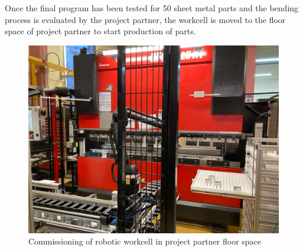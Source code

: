 Once the final program has been tested for 50 sheet metal parts and the bending process is evaluated by the project partner, the workcell is moved to the floor space of project partner to start production of parts.

\begin{figure}[h]
    \centering
    \includegraphics[width=\textwidth]{figures/commissioning.jpeg}
    \caption{Commissioning of robotic workcell in project partner floor space}
    \label{fig:commissioning}
\end{figure}
